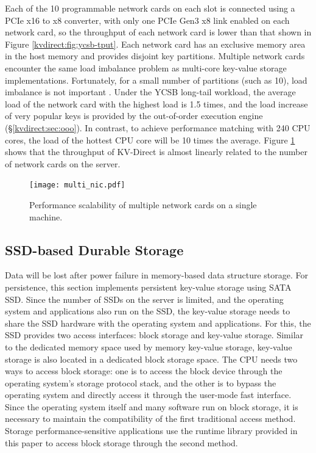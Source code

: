Each of the 10 programmable network cards on each slot is connected using a PCIe x16 to x8 converter, with only one PCIe Gen3 x8 link enabled on each network card, so the throughput of each network card is lower than that shown in Figure \ref {kvdirect:fig:ycsb-tput}.
Each network card has an exclusive memory area in the host memory and provides disjoint key partitions.
Multiple network cards encounter the same load imbalance problem as multi-core key-value storage implementations.
Fortunately, for a small number of partitions (such as 10), load imbalance is not important \cite {lim2014mica,li2016full}. Under the YCSB long-tail workload, the average load of the network card with the highest load is 1.5 times, and the load increase of very popular keys is provided by the out-of-order execution engine (\S \ref {kvdirect:sec:ooo}).
In contrast, to achieve performance matching with 240 CPU cores, the load of the hottest CPU core will be 10 times the average.
Figure \ref {kvdirect:fig:multiple-nics} shows that the throughput of KV-Direct is almost linearly related to the number of network cards on the server.

\begin{figure}[htbp]
	\centering
	\texttt{[image: multi\_nic.pdf]}
	\caption{Performance scalability of multiple network cards on a single machine.}
	\label{kvdirect:fig:multiple-nics}
\end{figure}

\subsection{SSD-based Durable Storage}
\label{sec:durable-storage}

Data will be lost after power failure in memory-based data structure storage. For persistence, this section implements persistent key-value storage using SATA SSD. Since the number of SSDs on the server is limited, and the operating system and applications also run on the SSD, the key-value storage needs to share the SSD hardware with the operating system and applications.
For this, the SSD provides two access interfaces: block storage and key-value storage. Similar to the dedicated memory space used by memory key-value storage, key-value storage is also located in a dedicated block storage space.
The CPU needs two ways to access block storage: one is to access the block device through the operating system's storage protocol stack, and the other is to bypass the operating system and directly access it through the user-mode fast interface.
Since the operating system itself and many software run on block storage, it is necessary to maintain the compatibility of the first traditional access method.
Storage performance-sensitive applications use the runtime library provided in this paper to access block storage through the second method.

